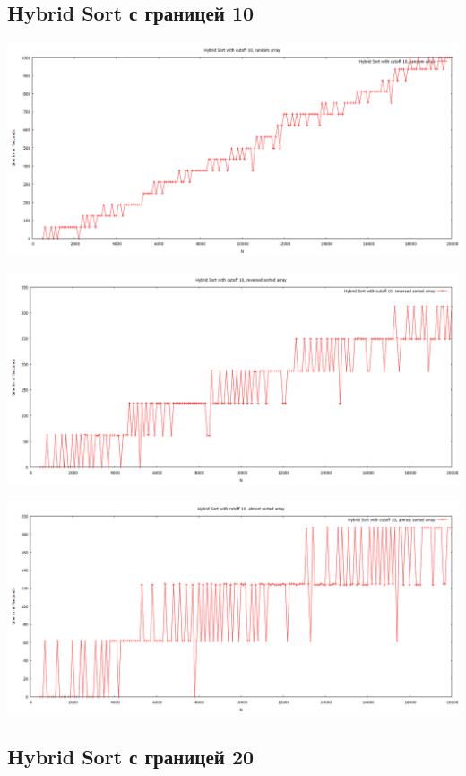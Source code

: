 \documentclass[11pt,a4paper]{article}
\begin{document}
\subsection*{Hybrid Sort с границей 10}

\hspace*{-2cm} \includegraphics[scale=0.5]{hybrid_sort_10_random_data.PNG}

\hspace*{-2cm} \includegraphics[scale=0.5]{hybrid_sort_10_reversed_sorted_data.PNG}

\hspace*{-2cm} \includegraphics[scale=0.5]{hybrid_sort_10_almost_sorted_data.PNG}

\subsection*{Hybrid Sort с границей 20}
\end{document}
